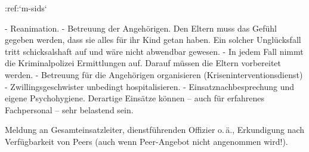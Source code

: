 :ref:`m-sids`
\begin{itemize}
	-   Reanimation.
	-   Betreuung der Angehörigen. Den Eltern muss das Gefühl
	gegeben werden, dass sie alles für ihr Kind getan haben. Ein solcher
	Unglücksfall tritt schicksalshaft auf und wäre nicht abwendbar gewesen. 
	-   In jedem Fall nimmt die Kriminalpolizei Ermittlungen auf. Darauf müssen
	die Eltern vorbereitet werden. 
	-   Betreuung für die Angehörigen organisieren
	(Kriseninterventionsdienst)
	-   Zwillingsgeschwister unbedingt hospitalisieren.
	-   Einsatznachbesprechung und eigene Psychohygiene. Derartige Einsätze
	können -- auch für erfahrenes Fachpersonal -- sehr belastend sein. 
	
    Meldung an Gesamteinsatzleiter, dienstführenden
    Offizier o.\,ä., Erkundigung nach Verfügbarkeit von
    Peers (auch wenn Peer-Angebot nicht angenommen wird!). 
\end{itemize}

